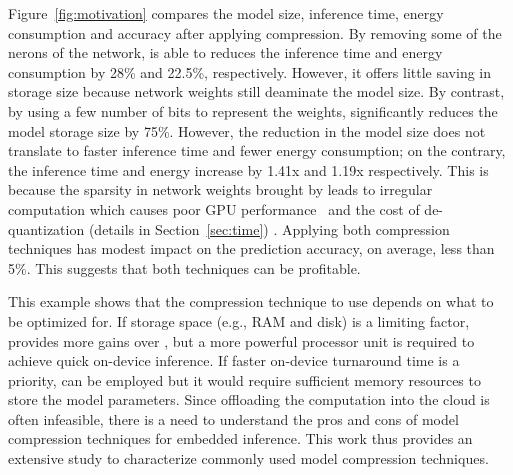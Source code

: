  Figure~\ref{fig:motivation} compares the model size, inference time, energy consumption and accuracy after
applying compression. By removing some of the nerons of the network, \pruning is able to reduces the inference time and energy consumption
by 28\% and 22.5\%, respectively. However, it offers little saving in storage size because network weights still deaminate the model size.
By contrast, by using a few number of bits to represent the weights, \quantization significantly reduces the model storage size by 75\%.
However, the reduction in the model size does not translate to faster inference time and fewer energy consumption; on the contrary, the
inference time and energy increase by 1.41x and 1.19x respectively. This is because the sparsity in network weights brought by
\quantization leads to irregular computation which causes poor GPU performance~\cite{DBLP:journals/corr/abs-1802-10280} and the cost of
de-quantization (details in Section~\ref{sec:time}) . Applying both compression techniques has modest impact on the prediction accuracy, on
average, less than 5\%. This suggests that both techniques can be profitable.

 This example shows that the compression technique to use depends on what to be optimized for. If storage
space (e.g., RAM and disk) is a limiting factor, \quantization provides more gains over \pruning, but a more powerful processor unit is
required to achieve quick on-device inference. If faster on-device turnaround time is a priority, \pruning can be employed but it would
require sufficient memory resources to store the model parameters.  Since offloading the computation into the cloud is often infeasible,
there is a need to understand the pros and cons of model compression techniques for embedded inference. This work thus provides an
extensive study to characterize commonly used model compression techniques.
